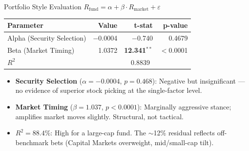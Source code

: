 \documentclass[11pt, aspectratio=43]{beamer}
\begin{document}
\begin{frame}{Portfolio Style Evaluation}
\centering
\small
$R_{\text{fund}} = \alpha + \beta \cdot R_{\text{market}} + \varepsilon$

\vspace{0.5em}

\begin{tabular}{l r r r}
\toprule
\textbf{Parameter} & \textbf{Value} & \textbf{t-stat} & \textbf{p-value} \\
\midrule
Alpha (Security Selection) & $-$0.0004 & $-$0.740 & 0.4679 \\
Beta (Market Timing) & 1.0372 & \textbf{12.341}$^{**}$ & $<$0.0001 \\
$R^2$ & \multicolumn{3}{c}{0.8839} \\
\bottomrule
\end{tabular}

\vspace{0.8em}
\begin{itemize}
    \small
    \item \textbf{Security Selection} ($\alpha = -0.0004$, $p=0.468$): Negative but insignificant --- no evidence of superior stock picking at the single-factor level.
    \item \textbf{Market Timing} ($\beta = 1.037$, $p<0.0001$): Marginally aggressive stance; amplifies market moves slightly. Structural, not tactical.
    \item \textbf{$R^2 = 88.4\%$}: High for a large-cap fund. The $\sim$12\% residual reflects off-benchmark bets (Capital Markets overweight, mid/small-cap tilt).
\end{itemize}
\end{frame}
\end{document}
